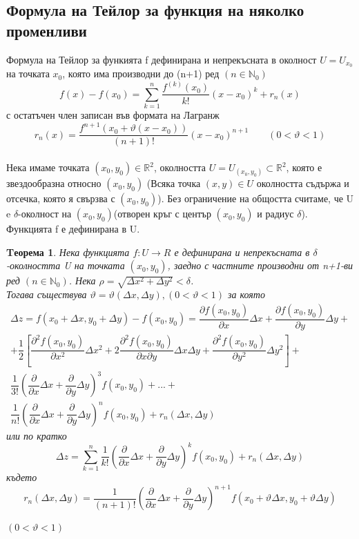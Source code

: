 \documentclass[a4paper,fleqn,12pt]{article}
\newtheorem{theorem}{Tеорема}[subsection]
\theoremstyle{definition}
\begin{document}
\subsection{Формула на Тейлор за функция на няколко променливи}
Формула на Тейлор за функията f дефинирана и непрекъсната в околност $U = U_{x_0}$ на точката $x_0$, която има производни до (n+1) ред $(n \in \mathbb{N}_0)$
$$f(x) - f(x_0) = \sum_{k=1} ^n \dfrac{f^{(k)}(x_0)}{k!} (x - x_0)^k  + r_n(x)$$
с остатъчен член записан във формата на Лагранж
$$r_n(x) = \dfrac{f^{n+1}(x_0 + \vartheta(x - x_0))}{(n+1)!} (x - x_0)^{n+1} \qquad (0 < \vartheta < 1)$$
\\
Нека имаме точката $(x_0,y_0) \in \mathbb{R}^2$, околността $U = U_{(x_0,y_0)} \subset \mathbb{R}^2$, която е звездообразна относно $(x_0,y_0)$ (Всяка точка $(x,y) \in U$ околността съдържа и отсечка, която я свързва с $(x_0,y_0)$). Без ограничение на общостта считаме, че U e $\delta$-околност на $(x_0,y_0)$(отворен кръг с център $(x_0,y_0)$ и радиус $\delta$). Функцията f е дефинирана в U.

\begin{theorem}
Нека функцията $f: U \to R$ е дефинирана и непрекъсната в $\delta$-околността U на точката $(x_0,y_0)$, заедно с частните производни от n+1-ви ред $(n \in \mathbb{N}_0)$. Нека $\rho = \sqrt{\Delta x^2 + \Delta y^2} < \delta$. \\
Тогава съществува $\vartheta = \vartheta(\Delta x, \Delta y),  (0 < \vartheta < 1)$ за която
\begin{gather*}
\Delta z = f(x_0 + \Delta x, y_0 + \Delta y) - f(x_0, y_0) = \dfrac{\partial f(x_0, y_0) }{\partial x} \Delta x + \dfrac{\partial f(x_0, y_0) }{\partial y} \Delta y + \\
+ \dfrac{1}{2} \left[ \dfrac{\partial^2 f(x_0, y_0) }{\partial x^2} \Delta x^2 + 2\dfrac{\partial^2 f(x_0, y_0) }{\partial x \partial y}\Delta x \Delta y +  \dfrac{\partial^2 f(x_0, y_0) }{\partial y^2} \Delta y^2 \right] + \\
\dfrac{1}{3!} \left(\dfrac{\partial}{\partial x} \Delta x+ \dfrac{\partial}{\partial y} \Delta y \right)^3 f(x_0, y_0) + ... + \\
\dfrac{1}{n!} \left(\dfrac{\partial}{\partial x} \Delta x+ \dfrac{\partial}{\partial y} \Delta y \right)^n f(x_0, y_0) + r_n(\Delta x, \Delta y) 
\end{gather*}
или по кратко
\begin{equation}
\Delta z = \sum_{k=1} ^n \dfrac{1}{k!} \left(\dfrac{\partial}{\partial x} \Delta x+ \dfrac{\partial}{\partial y} \Delta y \right)^k f(x_0, y_0) + r_n(\Delta x, \Delta y) 
\end{equation}
където 
\begin{equation}
r_n(\Delta x, \Delta y) = \dfrac{1}{(n+1)!} \left(\dfrac{\partial}{\partial x} \Delta x+ \dfrac{\partial}{\partial y} \Delta y \right)^{n+1} f(x_0 + \vartheta \Delta x,  y_0 + \vartheta \Delta y)
\end{equation}
\centerline{$(0 < \vartheta < 1)$}
\end{theorem}
\end{document}

